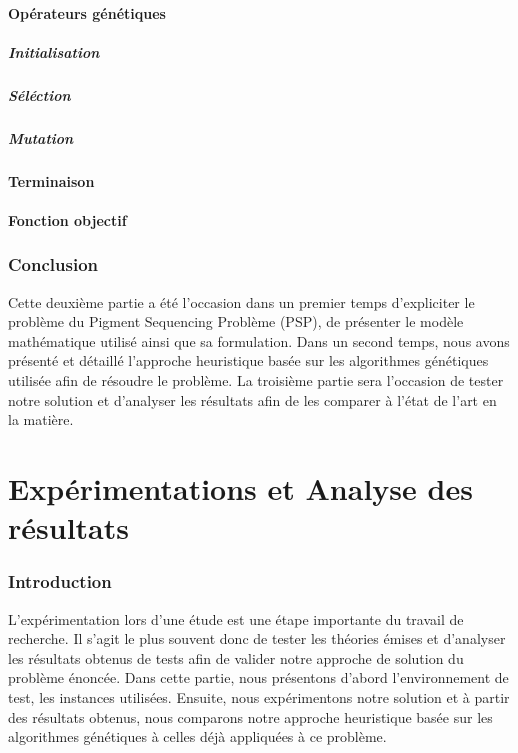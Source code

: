 \documentclass[12pt,a4paper]{article}
\begin{document}
			\subsection{Opérateurs génétiques}
				\subsubsection*{Initialisation}
				\subsubsection*{Séléction}
				\subsubsection*{Mutation}
				\subsection*{Terminaison}
			\subsection*{Fonction objectif}

		
		\section*{Conclusion}
		Cette deuxième partie a été l'occasion dans un premier temps d'expliciter le problème du Pigment Sequencing Problème (PSP), de présenter le modèle mathématique utilisé ainsi que sa formulation. Dans un second temps, nous avons présenté et détaillé l'approche heuristique basée sur les algorithmes génétiques utilisée afin de résoudre le problème. La troisième partie sera l'occasion de tester notre solution et d'analyser les résultats afin de les comparer à l'état de l'art en la matière.
		
	\newpage
	
	\part{Expérimentations et Analyse des résultats}
	\setcounter{section}{0}
		\section*{Introduction}
		L'expérimentation lors d'une étude est une étape importante du travail de recherche. Il s'agit le plus souvent donc de tester les théories émises et d'analyser les résultats obtenus de tests afin de valider notre approche de solution du problème énoncée. Dans cette partie, nous présentons d'abord l'environnement de test, les instances utilisées. Ensuite, nous expérimentons notre solution et à partir des résultats obtenus, nous comparons notre approche heuristique basée sur les algorithmes génétiques à celles déjà appliquées à ce problème.
		
\end{document}
